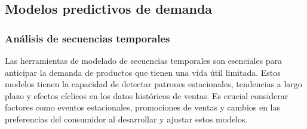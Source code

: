 

\subsection{Modelos predictivos de demanda}

\subsubsection{Análisis de secuencias temporales}
Las herramientas de modelado de secuencias temporales son esenciales para anticipar la demanda de productos que tienen una vida útil limitada. Estos modelos tienen la capacidad de detectar patrones estacionales, tendencias a largo plazo y efectos cíclicos en los datos históricos de ventas. Es crucial considerar factores como eventos estacionales, promociones de ventas y cambios en las preferencias del consumidor al desarrollar y ajustar estos modelos.


